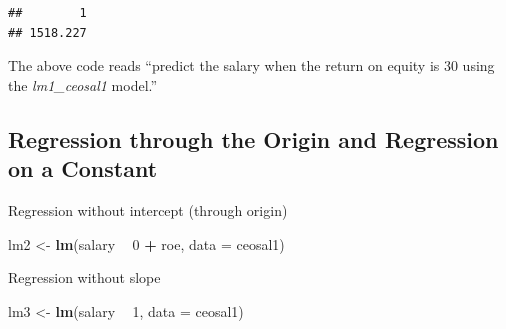 \documentclass[]{book}
\newenvironment{Shaded}{\begin{snugshade}}{\end{snugshade}}
\newcommand{\DataTypeTok}[1]{\textcolor[rgb]{0.13,0.29,0.53}{#1}}
\newcommand{\DecValTok}[1]{\textcolor[rgb]{0.00,0.00,0.81}{#1}}
\newcommand{\KeywordTok}[1]{\textcolor[rgb]{0.13,0.29,0.53}{\textbf{#1}}}
\newcommand{\NormalTok}[1]{#1}
\newcommand{\OperatorTok}[1]{\textcolor[rgb]{0.81,0.36,0.00}{\textbf{#1}}}
\newcommand{\StringTok}[1]{\textcolor[rgb]{0.31,0.60,0.02}{#1}}
\begin{document}
\begin{verbatim}
##        1 
## 1518.227
\end{verbatim}

The above code reads ``predict the salary when the return on equity is
30 using the \emph{lm1\_ceosal1} model.''

\hypertarget{regression-through-the-origin-and-regression-on-a-constant}{%
\subsection{Regression through the Origin and Regression on a
Constant}\label{regression-through-the-origin-and-regression-on-a-constant}}

Regression without intercept (through origin)

\begin{Shaded}
\begin{Highlighting}[]
\NormalTok{lm2 <-}\StringTok{ }\KeywordTok{lm}\NormalTok{(salary }\OperatorTok{~}\StringTok{  }\DecValTok{0} \OperatorTok{+}\StringTok{ }\NormalTok{roe, }\DataTypeTok{data =}\NormalTok{ ceosal1)}
\end{Highlighting}
\end{Shaded}

Regression without slope

\begin{Shaded}
\begin{Highlighting}[]
\NormalTok{lm3 <-}\StringTok{ }\KeywordTok{lm}\NormalTok{(salary }\OperatorTok{~}\StringTok{ }\DecValTok{1}\NormalTok{, }\DataTypeTok{data =}\NormalTok{ ceosal1)}
\end{Highlighting}
\end{Shaded}
\end{document}
